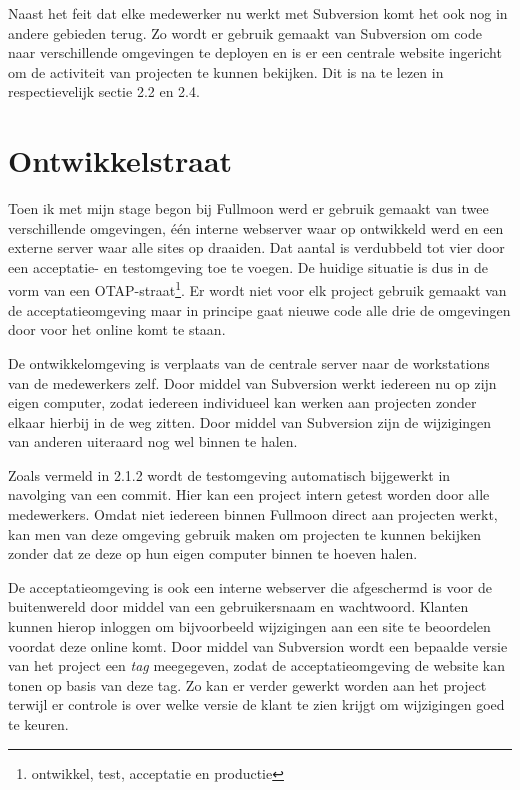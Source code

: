 Naast het feit dat elke medewerker nu werkt met Subversion komt het ook nog in andere gebieden terug. Zo wordt er gebruik gemaakt van Subversion om code naar verschillende omgevingen te deployen en is er een centrale website ingericht om de activiteit van projecten te kunnen bekijken. Dit is na te lezen in respectievelijk sectie 2.2 en 2.4.

\section{Ontwikkelstraat}

Toen ik met mijn stage begon bij Fullmoon werd er gebruik gemaakt van twee verschillende omgevingen, één interne webserver waar op ontwikkeld werd en een externe server waar alle sites op draaiden. Dat aantal is verdubbeld tot vier door een acceptatie- en testomgeving toe te voegen. De huidige situatie is dus in de vorm van een OTAP-straat\footnote{ontwikkel, test, acceptatie en productie}. Er wordt niet voor elk project gebruik gemaakt van de acceptatieomgeving maar in principe gaat nieuwe code alle drie de omgevingen door voor het online komt te staan.

De ontwikkelomgeving is verplaats van de centrale server naar de workstations van de medewerkers zelf. Door middel van Subversion werkt iedereen nu op zijn eigen computer, zodat iedereen individueel kan werken aan projecten zonder elkaar hierbij in de weg zitten. Door middel van Subversion zijn de wijzigingen van anderen uiteraard nog wel binnen te halen.

Zoals vermeld in 2.1.2 wordt de testomgeving automatisch bijgewerkt in navolging van een commit. Hier kan een project intern getest worden door alle medewerkers. Omdat niet iedereen binnen Fullmoon direct aan projecten werkt, kan men van deze omgeving gebruik maken om projecten te kunnen bekijken zonder dat ze deze op hun eigen computer binnen te hoeven halen.

De acceptatieomgeving is ook een interne webserver die afgeschermd is voor de buitenwereld door middel van een gebruikersnaam en wachtwoord. Klanten kunnen hierop inloggen om bijvoorbeeld wijzigingen aan een site te beoordelen voordat deze online komt. Door middel van Subversion wordt een bepaalde versie van het project een \emph{tag} meegegeven, zodat de acceptatieomgeving de website kan tonen op basis van deze tag. Zo kan er verder gewerkt worden aan het project terwijl er controle is over welke versie de klant te zien krijgt om wijzigingen goed te keuren.

